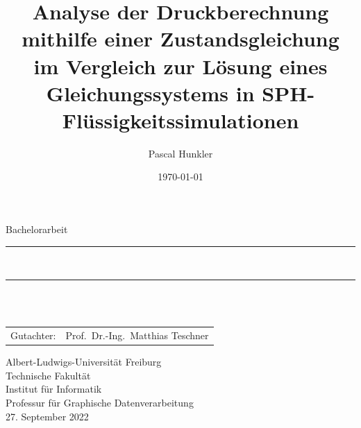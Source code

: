 \documentclass[11pt,
a4paper,
parskip=half, %
BCOR=10mm, %
english,
ngerman]{scrreprt}
\title{Analyse der Druckberechnung mithilfe einer Zustandsgleichung im Vergleich zur Lösung eines Gleichungssystems in SPH-Flüssigkeitssimulationen}
\author{Pascal Hunkler}
\date{\today}
\newcommand{\firstexaminer}{Prof.~Dr.-Ing.~Matthias Teschner}
\newcommand{\advisers}{Prof.~Dr.-Ing.~Matthias Teschner}
\begin{document}
\begin{titlepage}
    \begin{center}
    
    \newcommand{\HorizontalLine}{\rule{\linewidth}{0.3mm}}
    
    {\Large Bachelorarbeit}\\[1.3cm]
    
    
    \HorizontalLine \\[0.4cm]
    { \huge \bfseries \thetitle }
    \HorizontalLine \\[1.5cm]
    
    
    {\Huge \theauthor} \\[2cm]
    
    
    \begin{tabular}[hc]{>{\huge}l >{\huge}l}
      Gutachter: & \firstexaminer \\[0.3cm]
    \end{tabular}
    \vfill  %
    
    \Large {
        Albert-Ludwigs-Universität Freiburg\\
        Technische Fakultät\\
        Institut für Informatik\\
        Professur für Graphische Datenverarbeitung\\[1cm]
    
        27. September 2022
        \\
    }
    \end{center}
    \end{titlepage}
    
\end{document}
